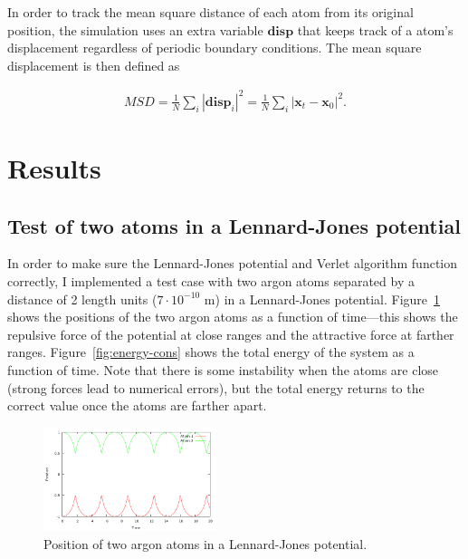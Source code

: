 \documentclass[twocolumn]{revtex4}
\begin{document}
In order to track the mean square distance of each atom from its original position, the simulation uses an extra variable $\mathbf{disp}$ that keeps track of a atom's displacement regardless of periodic boundary conditions. The mean square displacement is then defined as

\begin{align}
MSD = \frac{1}{N} \sum_i |\mathbf{disp}_i|^2 = \frac{1}{N} \sum_i |\mathbf{x}_t - \mathbf{x}_0|^2.
\end{align}

\section{Results}

\subsection{Test of two atoms in a Lennard-Jones potential}

In order to make sure the Lennard-Jones potential and Verlet algorithm function correctly, I implemented a test case with two argon atoms separated by a distance of 2 length units ($7\cdot10^{-10}$ m) in a Lennard-Jones potential. Figure~\ref{fig:lj-pos} shows the positions of the two argon atoms as a function of time---this shows the repulsive force of the potential at close ranges and the attractive force at farther ranges. Figure~\ref{fig:energy-cons} shows the total energy of the system as a function of time. Note that there is some instability when the atoms are close (strong forces lead to numerical errors), but the total energy returns to the correct value once the atoms are farther apart.

\begin{figure}[htb]
\begin{center}
\leavevmode
\includegraphics[width=0.45\textwidth]{lj-pos.png}
\end{center}
\caption{Position of two argon atoms in a Lennard-Jones potential.}
\label{fig:lj-pos}
\end{figure}
\end{document}
